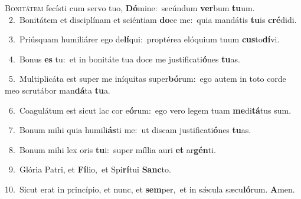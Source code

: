 \lettrine{\initial\textcolor{\initialcolor}{B}}{onitátem} fecísti cum servo tuo, \textbf{Dó}\-mine:~\star secúndum \textbf{ver}\-bum \textbf{tu}\-um.\\
{\numbfont\textcolor{\numbcolor}{~2.}}~Bonitátem et disciplínam et sciéntiam \textbf{do}\-ce me:~\star quia mandátis \textbf{tu}\-is \textbf{cré}\-didi.\par
{\numbfont\textcolor{\numbcolor}{~3.}}~Priúsquam humiliárer ego de\-\textbf{lí}\-qui:~\star proptérea elóquium tuum \textbf{cus}\-to\-\textbf{dí}\-vi.\par
{\numbfont\textcolor{\numbcolor}{~4.}}~Bonus \textbf{es} tu:~\star et in bonitáte tua doce me justificati\-\textbf{ó}\-nes \textbf{tu}\-as.\par
{\numbfont\textcolor{\numbcolor}{~5.}}~Multiplicáta est super me iníquitas super\-\textbf{bó}\-rum:~\star ego autem in toto corde meo scrutábor man\-\textbf{dá}\-ta \textbf{tu}\-a.\par
{\numbfont\textcolor{\numbcolor}{~6.}}~Coagulátum est sicut lac cor e\-\textbf{ó}\-rum:~\star ego vero legem tuam \textbf{me}\-di\-\textbf{tá}\-tus sum.\par
{\numbfont\textcolor{\numbcolor}{~7.}}~Bonum mihi quia humili\-\textbf{ás}\-ti me:~\star ut discam justificati\-\textbf{ó}\-nes \textbf{tu}\-as.\par
{\numbfont\textcolor{\numbcolor}{~8.}}~Bonum mihi lex oris \textbf{tu}\-i:~\star super míllia auri \textbf{et} ar\-\textbf{gén}\-ti.\par
{\numbfont\textcolor{\numbcolor}{~9.}}~Glória Patri, et \textbf{Fí}\-lio,~\star et Spi\-\textbf{rí}\-tui \textbf{Sanc}\-to.\par
{\numbfont\textcolor{\numbcolor}{10.}}~Sicut erat in princípio, et nunc, et \textbf{sem}\-per,~\star et in sǽcula sæcu\-\textbf{ló}\-rum. \textbf{A}\-men.\par
